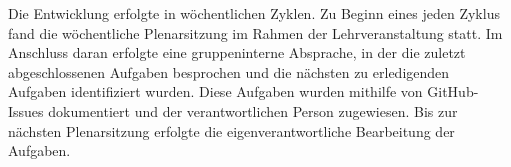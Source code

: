 Die Entwicklung erfolgte in wöchentlichen Zyklen.
Zu Beginn eines jeden Zyklus fand die wöchentliche Plenarsitzung im Rahmen der Lehrveranstaltung statt.
Im Anschluss daran erfolgte eine gruppeninterne Absprache, in der die zuletzt abgeschlossenen Aufgaben besprochen und die nächsten zu erledigenden Aufgaben identifiziert wurden.
Diese Aufgaben wurden mithilfe von GitHub-Issues dokumentiert und der verantwortlichen Person zugewiesen.
Bis zur nächsten Plenarsitzung erfolgte die eigenverantwortliche Bearbeitung der Aufgaben.
